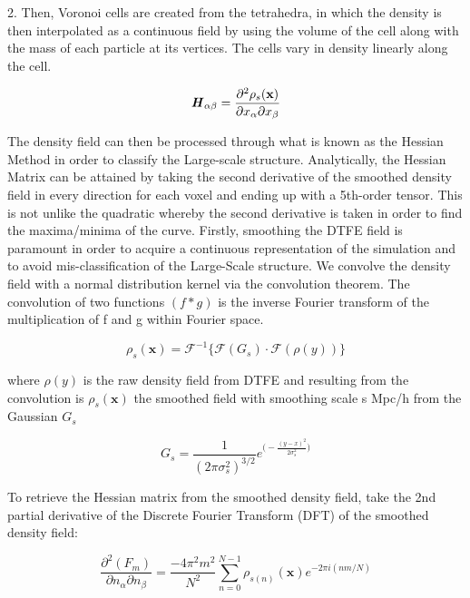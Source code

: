 \documentclass[a4paper,fleqn,usenatbib]{mnras}
\begin{document}
2. Then, Voronoi cells are created from the tetrahedra, in which the density is then interpolated as a continuous field by using the volume of the cell along with the mass of each particle at its vertices. The cells vary in density linearly along the cell.
\begin{ceqn}
\begin{equation}
\textbf{\textit{H}}_{\alpha \beta}=\frac{\partial^{2}\rho_{s}(\textbf{x})}{\partial x_{\alpha}\partial x_{\beta}}\label{hess}
\end{equation}
\end{ceqn}
The density field can then be processed through what is known as the Hessian Method in order to classify the Large-scale structure. Analytically, the Hessian Matrix can be attained by taking the second derivative of the smoothed density field in every direction for each voxel and ending up with a 5th-order tensor. This is not unlike the quadratic whereby the second derivative is taken in order to find the maxima/minima of the curve.
Firstly, smoothing the DTFE field is paramount in order to acquire a continuous representation of the simulation and to avoid mis-classification of the Large-Scale structure. We convolve the density field with a normal distribution kernel via the convolution theorem. The convolution of two functions $(f\ast g)$ is the inverse Fourier transform of the multiplication of f and g within Fourier space.
\begin{ceqn}
\begin{equation}
\rho_{s}(\textbf{x})=\mathcal{F}^{-1}\Big\{\mathcal{F}(G_{s})\cdot \mathcal{F}(\rho(y))\Big\} 
\end{equation}
\end{ceqn}
where $\rho(y)$ is the raw density field from DTFE and resulting from the convolution is $\rho_{s}(\textbf{x})$ the smoothed field with smoothing scale s Mpc/h from the Gaussian $G_{s}$
\begin{ceqn}
\begin{equation}
G_{s}=\frac{1}{(2\pi\sigma^{2}_s)^{3/2} }e^{\Big(-\frac{(y-x)^{2}}{2\sigma^{2}_{s}}\Big)}
\end{equation}
\end{ceqn}
To retrieve the Hessian matrix from the smoothed density field, take the 2nd partial derivative of the Discrete Fourier Transform (DFT) of the smoothed density field:
\begin{ceqn}
\begin{equation}
\frac{\partial^{2} (F_{m})}{\partial n_{\alpha} \partial n_{\beta}}=\frac{-4\pi^{2}m^{2}}{N^{2}}\sum_{n=0}^{N-1}\rho_{s(n)}(\textbf{x})e^{-2\pi i(nm/N)} 
\end{equation}
\end{ceqn}
\end{document}
